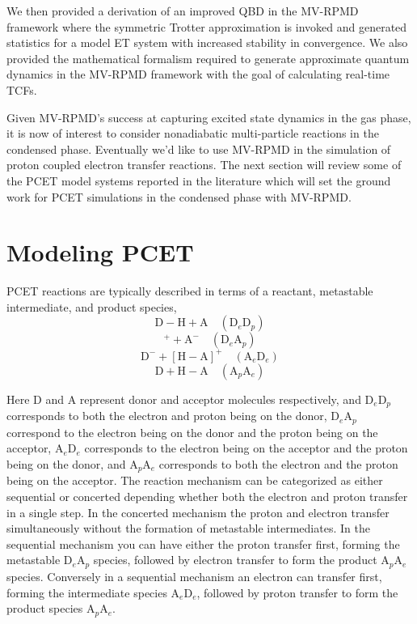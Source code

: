 \documentclass[phd,tocprelim]{cornell}
\begin{document}
We then provided a derivation of an improved QBD in the MV-RPMD framework where the symmetric Trotter approximation is invoked and generated statistics for a model ET system with increased stability in convergence. We also provided the mathematical formalism required to generate approximate quantum dynamics in the MV-RPMD framework with the goal of calculating real-time TCFs. 

Given MV-RPMD's success at capturing excited state dynamics in the gas phase, it is now of interest to consider nonadiabatic multi-particle reactions in the condensed phase. Eventually we'd like to use MV-RPMD in the simulation of proton coupled electron transfer reactions. The next section will review some of the PCET model systems reported in the literature which will set the ground work for PCET simulations in the condensed phase with MV-RPMD. 


\chapter{Modeling PCET}
PCET reactions are typically described in terms of a reactant, metastable intermediate, and product species,
\begin{equation}
\textrm{D}-\textrm{H} +\textrm{A}  \quad (\textrm{D}_{e}\textrm{D}_{p})
\end{equation}
\begin{equation}
[\textrm{D}-\textrm{H}]^{+} +\textrm{A}^{-}  \quad (\textrm{D}_{e}\textrm{A}_{p})
\end{equation}
\begin{equation}
\textrm{D}^{-}+ [\textrm{H} -\textrm{A}]^{+}  \quad (\textrm{A}_{e}\textrm{D}_{e})
\end{equation}
\begin{equation}
\textrm{D} + \textrm{H}-\textrm{A}  \quad (\textrm{A}_{p}\textrm{A}_{e})
\end{equation}

Here D and A represent donor and acceptor molecules respectively, and $\textrm{D}_{e}\textrm{D}_{p}$ corresponds to both the electron and proton being on the donor, $\textrm{D}_{e}\textrm{A}_{p}$ correspond to the electron being on the donor and the proton being on the acceptor, $\textrm{A}_{e}\textrm{D}_{e}$ corresponds to the electron being on the acceptor and the proton being on the donor, and $\textrm{A}_{p}\textrm{A}_{e}$ corresponds to both the electron and the proton being on the acceptor. The reaction mechanism can be categorized as either sequential or concerted depending whether both the electron and proton transfer in a single step. In the concerted mechanism the proton and electron transfer simultaneously without the formation of metastable intermediates. In the sequential mechanism you can have either the proton transfer first, forming the metastable  $\textrm{D}_{e}\textrm{A}_{p}$ species, followed by electron transfer to form the product $\textrm{A}_{p}\textrm{A}_{e}$ species. Conversely in a sequential mechanism an electron can transfer first, forming the intermediate species $\textrm{A}_{e}\textrm{D}_{e}$, followed by proton transfer to form the product species $\textrm{A}_{p}\textrm{A}_{e}$. 
\end{document}

